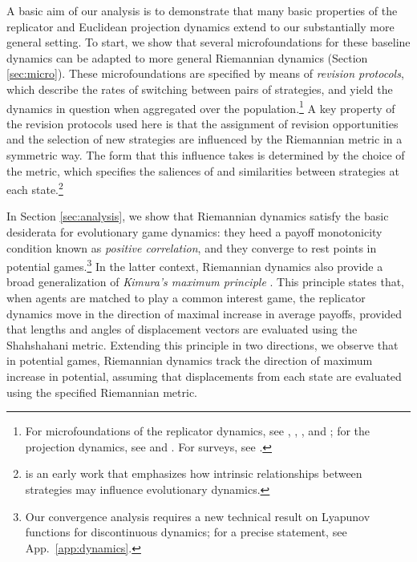 \documentclass[reqno]{amsart}
\theoremstyle{plain}
\theoremstyle{definition}
\theoremstyle{remark}
\numberwithin{equation}{section}
\numberwithin{theorem}{section}
\begin{document}
A basic aim of our analysis is to demonstrate that many basic properties of the replicator and Euclidean projection dynamics extend to our substantially more general setting.
To start, we show that several microfoundations for these baseline dynamics can be adapted to more general Riemannian dynamics (Section \ref{sec:micro}).
These microfoundations are specified by means of \emph{revision protocols}, which describe the rates of switching between pairs of strategies, and yield the dynamics in question when aggregated over the population.\footnote{For microfoundations of the replicator dynamics, see \cite{BW96}, \cite{Wei95}, \cite{Hel92}, and \cite{Sch98};
for the projection dynamics, see \cite{LS08} and \cite{SDL08}.
For surveys, see \cite{San10,San15}.}
A key property of the revision protocols used here is that the assignment of revision opportunities and the selection of new strategies are influenced by the Riemannian metric in a symmetric way.
The form that this influence takes is determined by the choice of the metric, which specifies
the saliences of and similarities between strategies at each state.\footnote{\cite{Set98} is an early work that emphasizes how intrinsic relationships between strategies may influence evolutionary dynamics.}

In Section \ref{sec:analysis}, we show that Riemannian dynamics satisfy the basic desiderata for evolutionary game dynamics:
they heed a payoff monotonicity condition known as \emph{positive correlation}, and they converge to rest points in potential games.\footnote{Our convergence analysis requires a new technical result on Lyapunov functions for discontinuous dynamics;
for a precise statement, see App.~\ref{app:dynamics}.}
In the latter context, Riemannian dynamics also provide a broad generalization of \emph{Kimura's maximum principle} \citep{Kim58,Sha79}.
This principle states that, when agents are matched to play a common interest game, the replicator dynamics move in the direction of maximal increase in average payoffs, provided that lengths and angles of displacement vectors are evaluated using the Shahshahani metric.
Extending this principle in two directions, we observe that in potential games, Riemannian dynamics track the direction of maximum increase in potential, assuming that displacements from each state are evaluated using the specified Riemannian metric.
\end{document}
